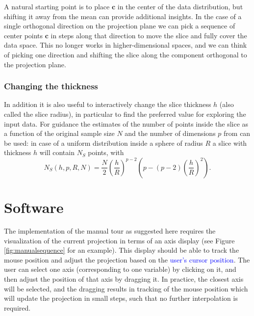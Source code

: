 \documentclass[]{interact}
\theoremstyle{plain}%
\theoremstyle{definition}
\theoremstyle{remark}
\begin{document}
A natural starting point is to place \(\mathbf{c}\) in the center of the
data distribution, but shifting it away from the mean can provide
additional insights. In the case of a single orthogonal direction on the
projection plane we can pick a sequence of center points \(\mathbf{c}\)
in steps along that direction to move the slice and fully cover the data
space. This no longer works in higher-dimensional spaces, and we can
think of picking one direction and shifting the slice along the
component orthogonal to the projection plane.

\hypertarget{changing-the-thickness}{%
\subsubsection{Changing the thickness}\label{changing-the-thickness}}

In addition it is also useful to interactively change the slice
thickness \(h\) (also called the slice radius), in particular to find
the preferred value for exploring the input data. For guidance the
estimates of the number of points inside the slice as a function of the
original sample size \(N\) and the number of dimensions \(p\) from
\citet{sectionpursuit} can be used: in case of a uniform distribution
inside a sphere of radius \(R\) a slice with thickness \(h\) will
contain \(N_S\) points, with \begin{equation}
N_S(h, p, R, N) = \frac{N}{2} \left(\frac{h}{R}\right)^{p-2} \left(p - (p-2)\left(\frac{h}{R}\right)^{2}\right).
\label{eq:count}
\end{equation}

\hypertarget{sec:implementation}{%
\section{Software}\label{sec:implementation}}

The implementation of the manual tour as suggested here requires the
visualization of the current projection in terms of an axis display (see
Figure \ref{fig:manualsequence} for an example). This display should be
able to track the mouse position and adjust the projection based on the
\textcolor{blue}{user's cursor position}. The user can select one axis
(corresponding to one variable) by clicking on it, and then adjust the
position of that axis by dragging it. In practice, the closest axis will
be selected, and the dragging results in tracking of the mouse position
which will update the projection in small steps, such that no further
interpolation is required.
\end{document}
